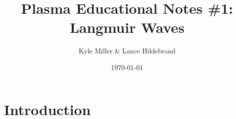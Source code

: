 \documentclass[12pt]{article}
\begin{document}
\title{\vspace{-5ex}Plasma Educational Notes \#1: Langmuir Waves\vspace{-1ex}}
\date{\vspace{-1ex}\today}
\author{Kyle Miller \& Lance Hildebrand}
\maketitle

\section*{Introduction}
\end{document}
